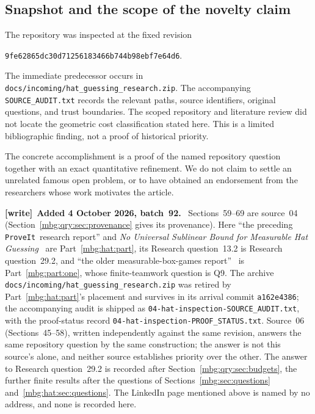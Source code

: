 \documentclass[11pt,letterpaper]{article}
\theoremstyle{definition}
\newcommand{\repo}{\texttt{ProveIt}}
\newenvironment{writenote}[1][]{\par\smallskip\begingroup\small
 \noindent\textbf{[write]}\if\relax\detokenize{#1}\relax\else~\textbf{#1.}\fi\ }%
 {\par\endgroup\smallskip}
\begin{document}
\subsection{Snapshot and the scope of the novelty claim}

The repository was inspected at the fixed revision
\begin{center}
\small\texttt{9fe62865dc30d71256183466b744b98ebf7e64d6}.
\end{center}
The immediate predecessor occurs in
\nolinkurl{docs/incoming/hat_guessing_research.zip}.
The accompanying \nolinkurl{SOURCE_AUDIT.txt} records the relevant
paths, source identifiers, original questions, and trust boundaries.
The scoped repository and literature review did not locate the
geometric cost classification stated here. This is a limited
bibliographic finding, not a proof of historical priority.

The concrete accomplishment is a proof of the named repository
question together with an exact quantitative refinement. We do not
claim to settle an unrelated famous open problem, or to have obtained
an endorsement from the researchers whose work motivates the article.

\begin{writenote}[Added 4 October 2026, batch~92]
Sections~59--69 are source~04 (Section~\ref{mbg:qry:sec:provenance} gives its provenance). Here ``the preceding \repo\ research report'' and \emph{No Universal Sublinear Bound for Measurable Hat Guessing}~\cite{qry:PriorHat} are Part~\ref{mbg:hat:part}, its Research question~13.2 is Research question~29.2, and ``the older measurable-box-games report''~\cite{qry:RepoBoxes} is Part~\ref{mbg:part:one}, whose finite-teamwork question is Q9. The archive \texttt{docs/\allowbreak incoming/\allowbreak hat\_\allowbreak guessing\_\allowbreak research.zip} was retired by Part~\ref{mbg:hat:part}'s placement and survives in its arrival commit \texttt{a162e4386}; the accompanying audit is shipped as \texttt{04-hat-inspection-\allowbreak SOURCE\_\allowbreak AUDIT.txt}, with the proof-status record \texttt{04-hat-inspection-\allowbreak PROOF\_\allowbreak STATUS.txt}. Source~06 (Sections~45--58), written independently against the same revision, answers the same repository question by the same construction; the answer is not this source's alone, and neither source establishes priority over the other. The answer to Research question~29.2 is recorded after Section~\ref{mbg:qry:sec:budgets}, the further finite results after the questions of Sections~\ref{mbg:sec:questions} and~\ref{mbg:hat:sec:questions}. The LinkedIn page mentioned above is named by no address, and none is recorded here.
\end{writenote}
\end{document}
